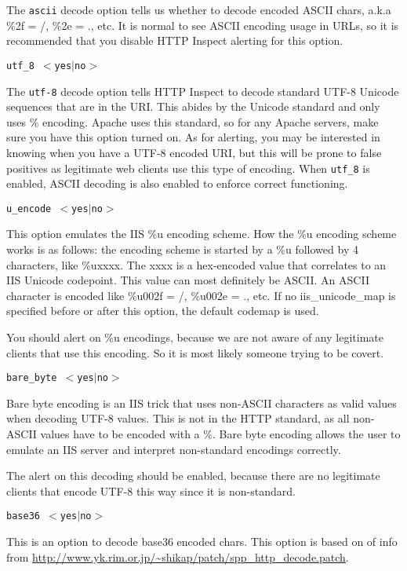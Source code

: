\documentclass[english]{report}
\newcounter{slistnum}
\newenvironment{slist}
{ \begin{list}{ {\bf \arabic{slistnum}.} }{\usecounter{slistnum} } }
{ \end{list} }
\begin{document}
\begin{slist}
The \texttt{ascii} decode option tells us whether to decode encoded ASCII chars, a.k.a
\%2f = /, \%2e = ., etc.  It is normal to see ASCII encoding usage in URLs, so it
is recommended that you disable HTTP Inspect alerting for this option.

\item \texttt{utf\_8 $<$yes$|$no$>$}

The \texttt{utf-8} decode option tells HTTP Inspect to decode standard UTF-8 Unicode
sequences that are in the URI.  This abides by the Unicode standard and only
uses \% encoding.  Apache uses this standard, so for any Apache servers, make
sure you have this option turned on.  As for alerting, you may be interested in
knowing when you have a UTF-8 encoded URI, but this will be prone to false
positives as legitimate web clients use this type of encoding.  When \texttt{utf\_8} is
enabled, ASCII decoding is also enabled to enforce correct functioning.  

\item \texttt{u\_encode $<$yes$|$no$>$}

This option emulates the IIS \%u encoding scheme.  How the \%u encoding scheme
works is as follows:  the encoding scheme is started by a \%u followed by 4
characters, like \%uxxxx.  The xxxx is a hex-encoded value that correlates to an IIS
Unicode codepoint.  This value can most definitely be ASCII.  An ASCII character is
encoded like \%u002f = /, \%u002e = ., etc.  If no iis\_unicode\_map is specified
before or after this option, the default codemap is used.

You should alert on \%u encodings, because we are not aware of any legitimate
clients that use this encoding.  So it is most likely someone trying to be
covert.

\item \texttt{bare\_byte $<$yes$|$no$>$}

Bare byte encoding is an IIS trick that uses non-ASCII characters as valid values when
decoding UTF-8 values.  This is not in the HTTP standard, as all non-ASCII
values have to be encoded with a \%.  Bare byte encoding allows the user to
emulate an IIS server and interpret non-standard encodings correctly.

The alert on this decoding should be enabled, because there are no legitimate
clients that encode UTF-8 this way since it is non-standard.

\item \texttt{base36 $<$yes$|$no$>$}

This is an option to decode base36 encoded chars.  This option is based on of
info from 
\url{http://www.yk.rim.or.jp/~shikap/patch/spp\_http\_decode.patch}.


\end{slist}
\end{document}
